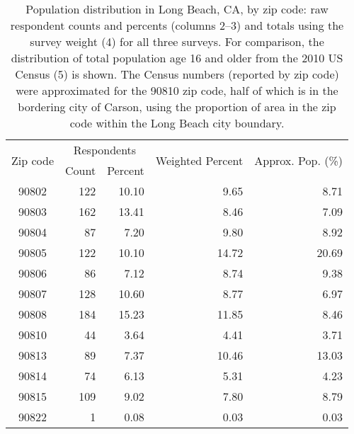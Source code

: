 \begin{table}
\begin{center}
\begin{tabular}{c|rrrr}
 \toprule
 \multirow{2}{*}{Zip code} & \multicolumn{2}{c}{Respondents} & \multirow{2}{*}{Weighted Percent} & \multirow{2}{*}{Approx. Pop. (\%)} \\
  & Count & Percent & &  \\ 
\hline
 90802 & 122 & 10.10 & 9.65 & 8.71 \\ 
 90803 & 162 & 13.41 & 8.46 & 7.09 \\ 
 90804 &  87 & 7.20 & 9.80 & 8.92 \\ 
 90805 & 122 & 10.10 & 14.72 & 20.69 \\ 
 90806 &  86 & 7.12 & 8.74 & 9.38 \\ 
 90807 & 128 & 10.60 & 8.77 & 6.97 \\ 
 90808 & 184 & 15.23 & 11.85 & 8.46 \\ 
 90810 &  44 & 3.64 & 4.41 & 3.71 \\ 
 90813 &  89 & 7.37 & 10.46 & 13.03 \\ 
 90814 &  74 & 6.13 & 5.31 & 4.23 \\ 
 90815 & 109 & 9.02 & 7.80 & 8.79 \\ 
 90822 &   1 & 0.08 & 0.03 & 0.03 \\ 
\bottomrule
\end{tabular}
\end{center}
\caption{Population distribution in Long Beach, CA, by zip code: raw respondent counts and percents (columns 2--3) and totals using the survey weight (4) for all three surveys.  For comparison, the distribution of total population age 16 and older from the 2010 US Census (5) is shown.  The Census numbers (reported by zip code) were approximated for the 90810 zip code, half of which is in the bordering city of Carson, using the proportion of area in the zip code within the Long Beach city boundary.}        
\label{table:PopComp}
\end{table}


